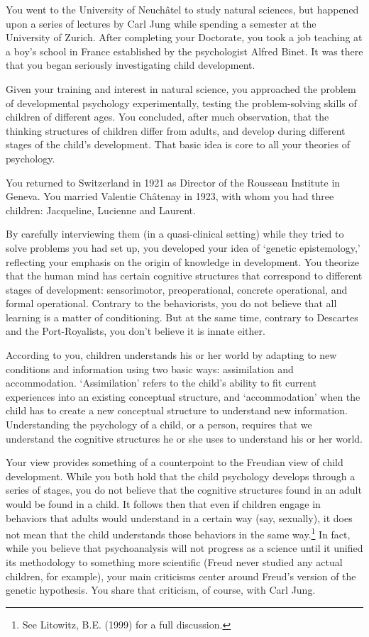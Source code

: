 \begin{refsection}
You went to the University of Neuchâtel to study natural sciences, but happened upon a series of lectures by Carl Jung while spending a semester at the University of Zurich. After completing your Doctorate, you took a job teaching at a boy's school in France established by the psychologist Alfred Binet. It was there that you began seriously investigating child development.

Given your training and interest in natural science, you approached the problem of developmental psychology experimentally, testing the problem-solving skills of children of different ages. You concluded, after much observation, that the thinking structures of children differ from adults, and develop during different stages of the child's development. That basic idea is core to all your theories of psychology.

You returned to Switzerland in 1921 as Director of the Rousseau Institute in Geneva. You married Valentie Châtenay in 1923, with whom you had three children: Jacqueline, Lucienne and Laurent. 

By carefully interviewing them (in a quasi-clinical setting) while they tried to solve problems you had set up, you developed your idea of `genetic epistemology,' reflecting your emphasis on the origin of knowledge in development. You theorize that the human mind has certain cognitive structures that correspond to different stages of development: sensorimotor, preoperational, concrete operational, and formal operational. Contrary to the behaviorists, you do not believe that all learning is a matter of conditioning. But at the same time, contrary to Descartes and the Port-Royalists, you don't believe it is innate either. 

According to you, children understands his or her world by adapting to new conditions and information using two basic ways: assimilation and accommodation. `Assimilation' refers to the child's ability to fit current experiences into an existing conceptual structure, and `accommodation' when the child has to create a new conceptual structure to understand new information. Understanding the psychology of a child, or a person, requires that we understand the cognitive structures he or she uses to understand his or her world.

Your view provides something of a counterpoint to the Freudian view of child development. While you both hold that the child psychology develops through a series of stages, you do not believe that the cognitive structures found in an adult would be found in a child. It follows then that even if children engage in behaviors that adults would understand in a certain way (say, sexually), it does not mean that the child understands those behaviors in the same way.\footnote{See Litowitz, B.E. (1999) for a full discussion.} In fact, while you believe that psychoanalysis will not progress as a science until it unified its methodology to something more scientific (Freud never studied any actual children, for example), your main criticisms center around Freud's version of the genetic hypothesis. You share that criticism, of course, with Carl Jung.


\end{refsection}
